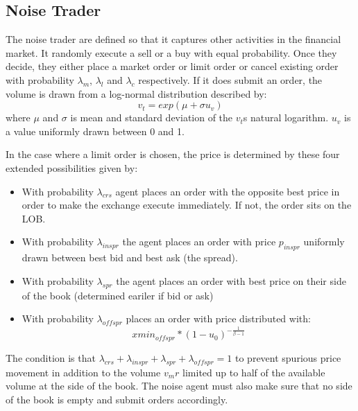 \subsection{Noise Trader} 
The noise trader are defined so that it captures other activities in the financial market. It randomly execute a sell or a buy with equal probability. Once they decide, they either place a market order or limit order or cancel existing order with probability $\lambda_{m}$, $\lambda_{l}$ and $\lambda_{c}$ respectively. If it does submit an order, the volume is drawn from a log-normal distribution described by:
\[ v_t = exp(\mu + \sigma u_v) \]
where $\mu$ and $\sigma$ is mean and standard deviation of the $v_t$s natural logarithm. $u_v$ is a value uniformly drawn between 0 and 1. 

In the case where a limit order is chosen, the price is determined by these four extended possibilities given by: 
\begin{itemize}
  \item With probability $\lambda_{crs}$ agent places an order with the opposite best price in order to make the exchange execute immediately. If not, the order sits on the LOB. 
  \item With probability $\lambda_{inspr}$ the agent places an order with price $p_{inspr}$ uniformly drawn between best bid and best ask (the spread). 
  \item With probability $\lambda_{spr}$ the agent places an order with best price on their side of the book (determined eariler if bid or ask)
  \item With probability $\lambda_{offspr}$ places an order with price distributed with:  
  \[ xmin_{offspr} * (1-u_0)^{-\frac{1}{\beta - 1}} \]
\end{itemize}
The condition is that $\lambda_{crs} + \lambda_{inspr} + \lambda_{spr} + \lambda_{offspr} = 1$ to prevent spurious price movement in addition to the volume $v_mr$ limited up to half of the available volume at the side of the book. The noise agent must also make sure that no side of the book is empty and submit orders accordingly. 

